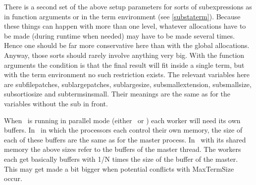 




There is a second set of the above setup parameters for sorts of 
subexpressions as in function arguments or in the 
term environment (see \ref{substaterm}). Because these things can happen 
with more than one level, whatever allocations have to be made (during 
runtime when needed) may have to be made several times. Hence one should be 
far more conservative here than with the global allocations. Anyway, those 
sorts should rarely involve anything very big. With the function arguments 
the condition is that the final result will fit inside a single term, but 
with the term environment no such restriction exists. The relevant 
variables here are subfilepatches, sublargepatches, sublargesize, 
subsmallextension, subsmallsize, subsortiosize and subtermsinsmall. Their 
meanings are the same as for the variables without the sub in front.

When \FORM\ is running in parallel mode (either \TFORM\ or \ParFORM) each worker 
will need its own buffers. In \ParFORM\ in which the processors each control 
their own memory, the size of each of these buffers are the same as for the 
master process. In \TFORM\ with its shared memory the above sizes refer to 
the buffers of the master thread. The workers each get basically buffers 
with 1/N times the size of the buffer of the master. This may get made a 
bit bigger when potential conflicts with MaxTermSize occur.

